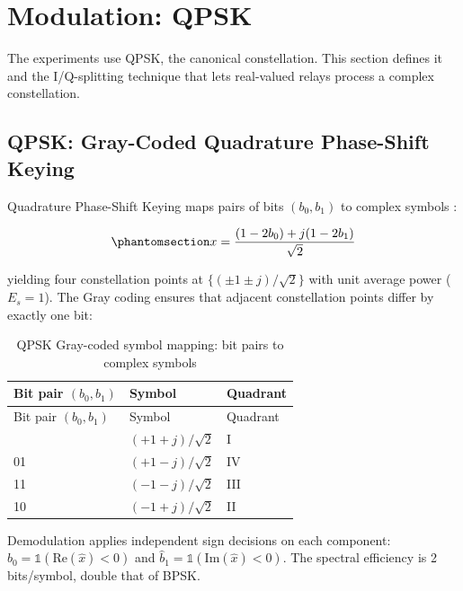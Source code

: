 \section{Modulation: QPSK}\label{sec:modulation-schemes}

The experiments use QPSK, the canonical constellation. This section defines it and the I/Q-splitting technique that lets real-valued relays process a complex constellation.

\subsection{QPSK: Gray-Coded Quadrature Phase-Shift Keying}\label{sec:qpsk-gray-coded-quadrature-phase-shift-keying}

Quadrature Phase-Shift Keying maps pairs of bits \((b_0, b_1)\) to complex symbols \cite{ProakisSalehi2008DigitalComm}:

\begin{equation}\protect\phantomsection\label{eq:qpsk-mapping}{x = \frac{(1 - 2b_0) + j(1 - 2b_1)}{\sqrt{2}}
}\end{equation}

yielding four constellation points at \(\{(\pm 1 \pm j)/\sqrt{2}\}\) with unit average power (\(E_s = 1\)). The Gray coding ensures that adjacent constellation points differ by exactly one bit:

\begin{longtable}[]{@{}lll@{}}
\caption[QPSK Gray-coded symbol mapping]{QPSK Gray-coded symbol mapping: bit pairs to complex symbols}\label{tbl:table29}\tabularnewline
\toprule\noalign{}
Bit pair \((b_0, b_1)\) & Symbol & Quadrant \\
\midrule\noalign{}
\endfirsthead
\toprule\noalign{}
Bit pair \((b_0, b_1)\) & Symbol & Quadrant \\
\midrule\noalign{}
\endhead
\bottomrule\noalign{}
\endlastfoot
00 & \((+1+j)/\sqrt{2}\) & I \\
01 & \((+1-j)/\sqrt{2}\) & IV \\
11 & \((-1-j)/\sqrt{2}\) & III \\
10 & \((-1+j)/\sqrt{2}\) & II \\
\end{longtable}

Demodulation applies independent sign decisions on each component: \(\hat{b}_0 = \mathbb{1}(\text{Re}(\hat{x}) < 0)\) and \(\hat{b}_1 = \mathbb{1}(\text{Im}(\hat{x}) < 0)\). The spectral efficiency is 2 bits/symbol, double that of BPSK.

